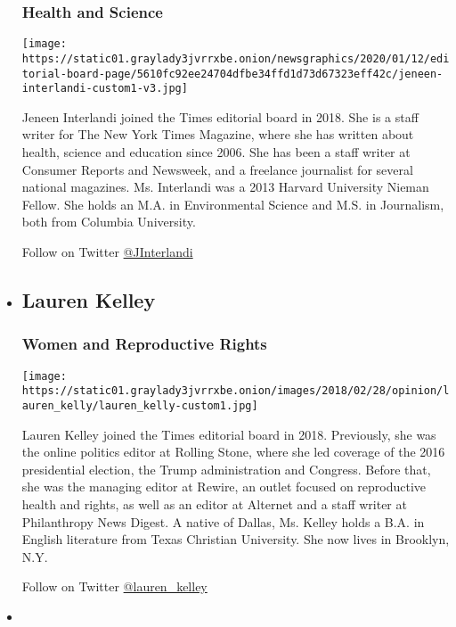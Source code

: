 \begin{itemize}
  \hypertarget{health-and-science}{%
  \subsubsection{Health and Science}\label{health-and-science}}

  \texttt{[image: https://static01.graylady3jvrrxbe.onion/newsgraphics/2020/01/12/editorial-board-page/5610fc92ee24704dfbe34ffd1d73d67323eff42c/jeneen-interlandi-custom1-v3.jpg]}

  Jeneen Interlandi joined the Times editorial board in 2018. She is a
  staff writer for The New York Times Magazine, where she has written
  about health, science and education since 2006. She has been a staff
  writer at Consumer Reports and Newsweek, and a freelance journalist
  for several national magazines. Ms. Interlandi was a 2013 Harvard
  University Nieman Fellow. She holds an M.A. in Environmental Science
  and M.S. in Journalism, both from Columbia University.

  Follow on Twitter \href{http://twitter.com/JInterlandi}{@JInterlandi}
\item
  \hypertarget{lauren-kelley}{%
  \subsection{Lauren Kelley}\label{lauren-kelley}}

  \hypertarget{women-and-reproductive-rights}{%
  \subsubsection{Women and Reproductive
  Rights}\label{women-and-reproductive-rights}}

  \texttt{[image: https://static01.graylady3jvrrxbe.onion/images/2018/02/28/opinion/lauren\_kelly/lauren\_kelly-custom1.jpg]}

  Lauren Kelley joined the Times editorial board in 2018. Previously,
  she was the online politics editor at Rolling Stone, where she led
  coverage of the 2016 presidential election, the Trump administration
  and Congress. Before that, she was the managing editor at Rewire, an
  outlet focused on reproductive health and rights, as well as an editor
  at Alternet and a staff writer at Philanthropy News Digest. A native
  of Dallas, Ms. Kelley holds a B.A. in English literature from Texas
  Christian University. She now lives in Brooklyn, N.Y.

  Follow on Twitter
  \href{http://twitter.com/lauren_kelley}{@lauren\_kelley}
\item
  \hypertarget{alex-kingsbury}{%
}
\end{itemize}
